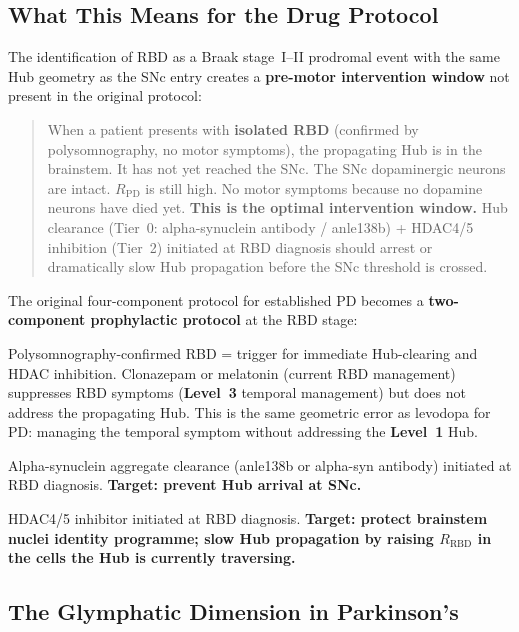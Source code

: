 \documentclass[12pt,a4paper]{article}
\newcommand{\Lev}[1]{\textbf{Level~#1}}
\begin{document}
\subsection{What This Means for the Drug Protocol}

The identification of RBD as a Braak stage~I--II prodromal event with the
same Hub geometry as the SNc entry creates a \textbf{pre-motor intervention
window} not present in the original protocol:

\begin{quote}
When a patient presents with \textbf{isolated RBD} (confirmed by polysomnography,
no motor symptoms), the propagating Hub is in the brainstem. It has not
yet reached the SNc. The SNc dopaminergic neurons are intact.
$R_{\mathrm{PD}}$ is still high. No motor symptoms because no dopamine
neurons have died yet.
\textbf{This is the optimal intervention window.}
Hub clearance (Tier~0: alpha-synuclein antibody / anle138b) + HDAC4/5
inhibition (Tier~2) initiated at RBD diagnosis should arrest or dramatically
slow Hub propagation before the SNc threshold is crossed.
\end{quote}

The original four-component protocol for established PD becomes a
\textbf{two-component prophylactic protocol} at the RBD stage:

\begin{description}[leftmargin=2em, itemsep=0.5em]
  \item[\textbf{Component 0 (RBD stage):}] Polysomnography-confirmed RBD
    = trigger for immediate Hub-clearing and HDAC inhibition. Clonazepam
    or melatonin (current RBD management) suppresses RBD symptoms
    (\Lev{3} temporal management) but does not address the propagating Hub.
    This is the same geometric error as levodopa for PD: managing the
    temporal symptom without addressing the \Lev{1} Hub.
  \item[\textbf{Component 1 (RBD stage):}] Alpha-synuclein aggregate clearance
    (anle138b or alpha-syn antibody) initiated at RBD diagnosis.
    \textbf{Target: prevent Hub arrival at SNc.}
  \item[\textbf{Component 2 (RBD stage):}] HDAC4/5 inhibitor initiated
    at RBD diagnosis. \textbf{Target: protect brainstem nuclei identity
    programme; slow Hub propagation by raising $R_{\mathrm{RBD}}$ in
    the cells the Hub is currently traversing.}
\end{description}

\subsection{The Glymphatic Dimension in Parkinson's}
\end{document}
